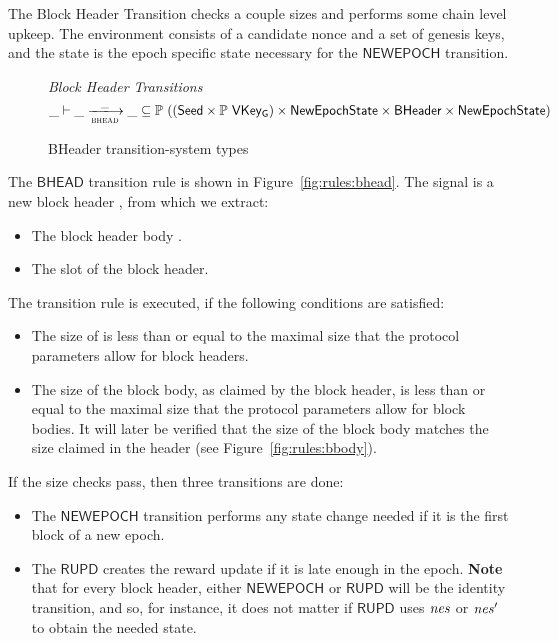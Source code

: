 The Block Header Transition checks a couple sizes and performs some chain level upkeep.
The environment consists of a candidate nonce and a set of genesis keys, and the state is the
epoch specific state necessary for the $\mathsf{NEWEPOCH}$ transition.

\begin{figure}
  \emph{Block Header Transitions}
  \begin{equation*}
    \_ \vdash \var{\_} \trans{bhead}{\_} \var{\_} \subseteq
    \powerset ((\Seed\times\powerset{\VKeyGen}) \times \NewEpochState \times \BHeader \times \NewEpochState)
  \end{equation*}
  \caption{BHeader transition-system types}
  \label{fig:ts-types:bheader}
\end{figure}

The $\mathsf{BHEAD}$ transition rule is shown in Figure~\ref{fig:rules:bhead}.
The signal is a new block header , from which we extract:

\begin{itemize}
\item The block header body .
\item The slot  of the block header.
\end{itemize}

The transition rule is executed, if the following conditions are satisfied:

\begin{itemize}
\item The size of  is less than or equal to the maximal size that the
  protocol parameters allow for block headers.
\item The size of the block body, as claimed by the block header, is less than or equal to the
  maximal size that the protocol parameters allow for block bodies.
  It will later be verified that the size of the block body matches the size claimed
  in the header (see Figure~\ref{fig:rules:bbody}).
\end{itemize}

If the size checks pass, then three transitions are done:

\begin{itemize}
  \item The $\mathsf{NEWEPOCH}$ transition performs any state change needed if it is the first
    block of a new epoch.
  \item The $\mathsf{RUPD}$ creates the reward update if it is late enough in the epoch.
    \textbf{Note} that for every block header, either $\mathsf{NEWEPOCH}$ or $\mathsf{RUPD}$
    will be the identity transition, and so, for instance, it does not matter if $\mathsf{RUPD}$
    uses $\mathit{nes}$ or $\mathit{nes}'$ to obtain the needed state.
\end{itemize}

